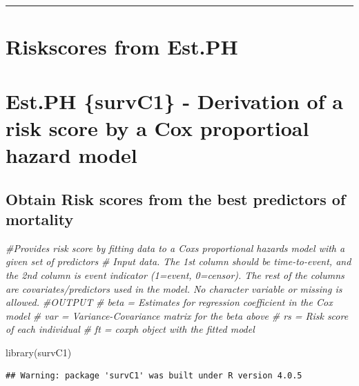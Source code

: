 \documentclass[
  11pt,
]{article}
\newenvironment{Shaded}{\begin{snugshade}}{\end{snugshade}}
\newcommand{\CommentTok}[1]{\textcolor[rgb]{0.56,0.35,0.01}{\textit{#1}}}
\newcommand{\FunctionTok}[1]{\textcolor[rgb]{0.00,0.00,0.00}{#1}}
\newcommand{\NormalTok}[1]{#1}
\begin{document}
\begin{center}\rule{0.5\linewidth}{0.5pt}\end{center}

\newpage
\section{Riskscores from Est.PH}

\hypertarget{est.ph-survc1---derivation-of-a-risk-score-by-a-cox-proportioal-hazard-model}{%
\section{Est.PH \{survC1\} - Derivation of a risk score by a Cox
proportioal hazard
model}\label{est.ph-survc1---derivation-of-a-risk-score-by-a-cox-proportioal-hazard-model}}

\hypertarget{obtain-risk-scores-from-the-best-predictors-of-mortality}{%
\subsection{Obtain Risk scores from the best predictors of
mortality}\label{obtain-risk-scores-from-the-best-predictors-of-mortality}}

\begin{Shaded}
\begin{Highlighting}[]
\CommentTok{\#Provides risk score by fitting data to a Cox\textquotesingle{}s proportional hazards model with a given set of predictors}
\CommentTok{\# Input data. The 1st column should be time{-}to{-}event, and the 2nd column is event indicator (1=event, 0=censor). The rest of the columns are covariates/predictors used in the model. No character variable or missing is allowed. }
\CommentTok{\#OUTPUT}
\CommentTok{\# beta = Estimates for regression coefficient in the Cox model}
\CommentTok{\# var = Variance{-}Covariance matrix for the beta above}
\CommentTok{\# rs    = Risk score of each individual}
\CommentTok{\# ft    = coxph object with the fitted model}

\FunctionTok{library}\NormalTok{(survC1)}
\end{Highlighting}
\end{Shaded}

\begin{verbatim}
## Warning: package 'survC1' was built under R version 4.0.5
\end{verbatim}
\end{document}
